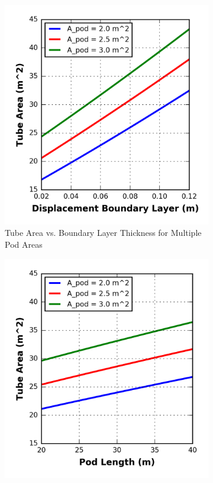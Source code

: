 \begin{figure}
\centering
\begin{subfigure}{.5\textwidth}
  \centering
  \includegraphics{../../images/graphs/boundary_layer_growth_trades/Tube_Area_vs_boundary_layer.png}
  \caption{Tube Area vs. Boundary Layer Thickness for Multiple Pod Areas}
  \label{fig:cross_sec_area_vs_disp_boundary_layer}
\end{subfigure}%
\begin{subfigure}{.5\textwidth}
  \centering
  \includegraphics{../../images/graphs/boundary_layer_length_trades/Tube_Area_vs_pod_length.png}

\end{subfigure}
\end{figure}
